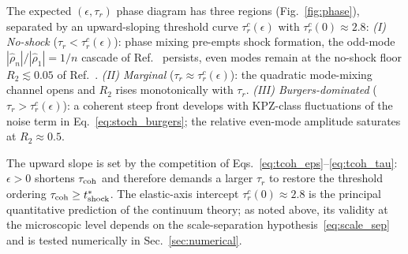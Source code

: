 \documentclass[aps,pre,twocolumn,superscriptaddress,longbibliography,floatfix]{revtex4-2}
\begin{document}
The expected $(\epsilon,\tau_r)$ phase diagram has three
regions (Fig.~\ref{fig:phase}), separated by an upward-sloping
threshold curve $\tau_r^c(\epsilon)$ with
$\tau_r^c(0)\approx 2.8$:
\emph{(I) No-shock} ($\tau_r<\tau_r^c(\epsilon)$): phase
mixing pre-empts shock formation, the odd-mode
$|\hat\rho_n|/|\hat\rho_1|=1/n$ cascade of
Ref.~\cite{PaperIV} persists, even modes remain at the
no-shock floor $R_2\lesssim 0.05$ of Ref.~\cite{PaperV}.
\emph{(II) Marginal} ($\tau_r\approx\tau_r^c(\epsilon)$):
the quadratic mode-mixing channel opens and $R_2$ rises
monotonically with $\tau_r$.
\emph{(III) Burgers-dominated} ($\tau_r>\tau_r^c(\epsilon)$):
a coherent steep front develops with KPZ-class
fluctuations of the noise term in
Eq.~\eqref{eq:stoch_burgers}; the relative even-mode
amplitude saturates at $R_2\approx 0.5$.

The upward slope is set by the competition of
Eqs.~\eqref{eq:tcoh_eps}--\eqref{eq:tcoh_tau}: $\epsilon>0$
shortens $\tau_{\rm coh}$ and therefore demands a larger
$\tau_r$ to restore the threshold ordering
$\tau_{\rm coh}\geq t^*_{\rm shock}$. The elastic-axis
intercept $\tau_r^c(0)\approx 2.8$ is the principal
quantitative prediction of the continuum theory; as noted
above, its validity at the microscopic level depends on the
scale-separation hypothesis~\eqref{eq:scale_sep} and is
tested numerically in Sec.~\ref{sec:numerical}.
\end{document}
